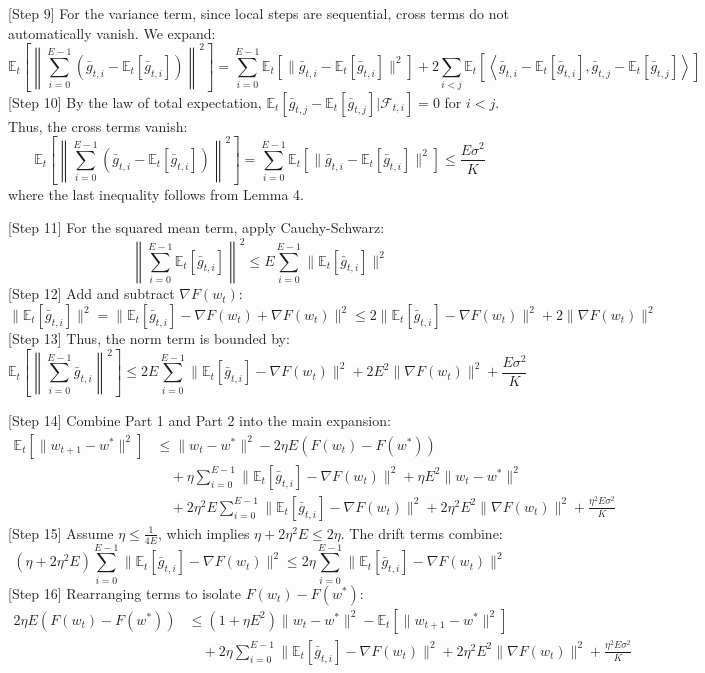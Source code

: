 \documentclass{article}
\begin{document}
[Step 9] For the variance term, since local steps are sequential, cross terms do not automatically vanish. We expand:
$$ \mathbb{E}_t\left[ \left\| \sum_{i=0}^{E-1} \left( \bar{g}_{t,i} - \mathbb{E}_t[\bar{g}_{t,i}] \right) \right\|^2 \right] = \sum_{i=0}^{E-1} \mathbb{E}_t[\|\bar{g}_{t,i} - \mathbb{E}_t[\bar{g}_{t,i}]\|^2] + 2\sum_{i<j} \mathbb{E}_t\left[ \left\langle \bar{g}_{t,i} - \mathbb{E}_t[\bar{g}_{t,i}], \bar{g}_{t,j} - \mathbb{E}_t[\bar{g}_{t,j}] \right\rangle \right] $$
[Step 10] By the law of total expectation, $\mathbb{E}_t[\bar{g}_{t,j} - \mathbb{E}_t[\bar{g}_{t,j}] | \mathcal{F}_{t,i}] = 0$ for $i < j$. Thus, the cross terms vanish:
$$ \mathbb{E}_t\left[ \left\| \sum_{i=0}^{E-1} \left( \bar{g}_{t,i} - \mathbb{E}_t[\bar{g}_{t,i}] \right) \right\|^2 \right] = \sum_{i=0}^{E-1} \mathbb{E}_t[\|\bar{g}_{t,i} - \mathbb{E}_t[\bar{g}_{t,i}]\|^2] \leq \frac{E\sigma^2}{K} $$
where the last inequality follows from Lemma 4.

[Step 11] For the squared mean term, apply Cauchy-Schwarz:
$$ \left\| \sum_{i=0}^{E-1} \mathbb{E}_t[\bar{g}_{t,i}] \right\|^2 \leq E \sum_{i=0}^{E-1} \|\mathbb{E}_t[\bar{g}_{t,i}]\|^2 $$
[Step 12] Add and subtract $\nabla F(w_t)$:
$$ \|\mathbb{E}_t[\bar{g}_{t,i}]\|^2 = \|\mathbb{E}_t[\bar{g}_{t,i}] - \nabla F(w_t) + \nabla F(w_t)\|^2 \leq 2\|\mathbb{E}_t[\bar{g}_{t,i}] - \nabla F(w_t)\|^2 + 2\|\nabla F(w_t)\|^2 $$
[Step 13] Thus, the norm term is bounded by:
$$ \mathbb{E}_t\left[ \left\| \sum_{i=0}^{E-1} \bar{g}_{t,i} \right\|^2 \right] \leq 2E \sum_{i=0}^{E-1} \|\mathbb{E}_t[\bar{g}_{t,i}] - \nabla F(w_t)\|^2 + 2E^2 \|\nabla F(w_t)\|^2 + \frac{E\sigma^2}{K} $$

[Step 14] Combine Part 1 and Part 2 into the main expansion:
\begin{align*}
\mathbb{E}_t[\|w_{t+1} - w^*\|^2] &\leq \|w_t - w^*\|^2 - 2\eta E (F(w_t) - F(w^*)) \\
&\quad + \eta \sum_{i=0}^{E-1} \|\mathbb{E}_t[\bar{g}_{t,i}] - \nabla F(w_t)\|^2 + \eta E^2 \|w_t - w^*\|^2 \\
&\quad + 2\eta^2 E \sum_{i=0}^{E-1} \|\mathbb{E}_t[\bar{g}_{t,i}] - \nabla F(w_t)\|^2 + 2\eta^2 E^2 \|\nabla F(w_t)\|^2 + \frac{\eta^2 E \sigma^2}{K}
\end{align*}
[Step 15] Assume $\eta \leq \frac{1}{4E}$, which implies $\eta + 2\eta^2 E \leq 2\eta$. The drift terms combine:
$$ (\eta + 2\eta^2 E) \sum_{i=0}^{E-1} \|\mathbb{E}_t[\bar{g}_{t,i}] - \nabla F(w_t)\|^2 \leq 2\eta \sum_{i=0}^{E-1} \|\mathbb{E}_t[\bar{g}_{t,i}] - \nabla F(w_t)\|^2 $$
[Step 16] Rearranging terms to isolate $F(w_t) - F(w^*)$:
\begin{align*}
2\eta E (F(w_t) - F(w^*)) &\leq (1 + \eta E^2)\|w_t - w^*\|^2 - \mathbb{E}_t[\|w_{t+1} - w^*\|^2] \\
&\quad + 2\eta \sum_{i=0}^{E-1} \|\mathbb{E}_t[\bar{g}_{t,i}] - \nabla F(w_t)\|^2 + 2\eta^2 E^2 \|\nabla F(w_t)\|^2 + \frac{\eta^2 E \sigma^2}{K}
\end{align*}
\end{document}

